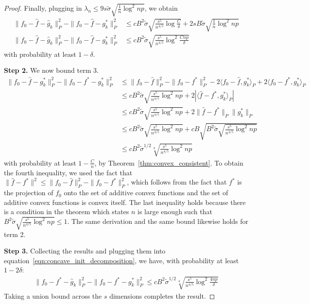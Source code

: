 \begin{proof}
Finally, plugging in $\lambda_n \leq 9 s \tilde{\sigma} \sqrt{
  \frac{1}{n} \log^2 np}$, we obtain
\begin{align*}
\| f_0 - \hat{f} - \hat{g}_k \|_P^2 - \|f_0 - \hat{f} - g^*_k \|_P^2 &
\leq c B^2 \tilde{\sigma} \sqrt{\frac{s^5}{n^{4/5}} \log \frac{C}{\delta}}+ 
    2s B \tilde{\sigma} \sqrt{\frac{1}{n} \log^2 np}\\
\| f_0 - \hat{f} - \hat{g}_k \|_P^2 - \|f_0 - \hat{f} - g^*_k \|_P^2 &
\leq c B^2 \tilde{\sigma} \sqrt{\frac{s^5}{n^{4/5}} \log^2 \frac{Cnp}{\delta}}
\end{align*}
with probability at least $1-\delta$.

\textbf{Step 2.} We now bound term 3.
\begin{align*}
\| f_0 - \hat{f} - g^*_k \|_P^2 - \| f_0 - f^* - g^*_k\|_P^2 &\leq 
    \| f_0 - \hat{f} \|_P^2 - \|f_0 - f^*\|_P^2 - 2\langle f_0 - \hat{f}, g^*_k \rangle_P
   + 2 \langle f_0 - f^*, g^*_k \rangle_P \\
 &\leq c B^2 \tilde{\sigma} \sqrt{ \frac{s^5}{n^{4/5}} \log^2 np} + 
    2 | \langle \hat{f} - f^*, g^*_k \rangle_P |  \\
 &\leq  c B^2 \tilde{\sigma} \sqrt{ \frac{s^5}{n^{4/5}} \log^2 np} +
    2 \| \hat{f} - f^* \|_P \| g^*_k \|_P \\
&\leq  c B^2 \tilde{\sigma} \sqrt{ \frac{s^5}{n^{4/5}} \log^2 np} +
   c B \sqrt{B^2 \tilde{\sigma} \sqrt{ 
                   \frac{s^5}{n^{4/5}} \log^2 np} }\\
&\leq  cB^2 \tilde{\sigma}^{1/2} \sqrt[4]{ 
                   \frac{s^5}{n^{4/5}} \log^2 np} 
\end{align*}
with probability at least $1-\frac{C}{n}$, by
Theorem~\ref{thm:convex_consistent}. To obtain the fourth inequality,
we used the fact that $\| \hat{f} - f^* \|^2 \leq \| f_0 - \hat{f}
\|_P^2 - \|f_0 - f^*\|_P^2$, which follows from the fact that $f^*$ is the
projection of $f_0$ onto the set of additive convex functions and the
set of additive convex functions is convex itself.
The last inequality holds because there is a condition in the theorem which states $n$
is large enough such that $B^2 \tilde{\sigma} \sqrt{ \frac{s^5}{n^{4/5}} \log^2 np} \leq 1$.
The same derivation and the same bound likewise holds for term 2.

\textbf{Step 3.} Collecting the results and plugging them into equation~\eqref{eqn:concave_init_decomposition}, we have, with probability at least $1-2\delta$:
\begin{align*}
\| f_0 - f^* - \hat{g}_k \|_P^2 - \|f_0 - f^* - g^*_k \|_P^2 \leq
   c B^2 \tilde{\sigma}^{1/2} 
     \sqrt[4]{ \frac{s^5}{n^{4/5}} \log^2 \frac{4np}{\delta}} 
\end{align*}
Taking a union bound across the $s$ dimensions completes the result.
\end{proof}








